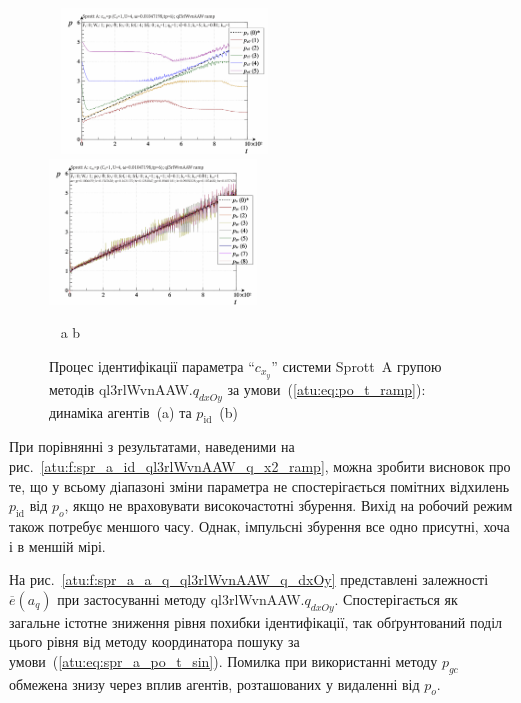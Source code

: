 \begin{figure}[htb!]
\begin{center}
  ~ \hfill
    \includegraphics[width=0.49\textwidth]{p/cha/spr_a/ql3rlWvnAAW_dxOy/sprott_a_id2-p_t_pi_ql3rlWvnAAW_ramp.png}
    \hfill
    \includegraphics[width=0.49\textwidth]{p/cha/spr_a/ql3rlWvnAAW_dxOy/sprott_a_id2-p_t_p_ql3rlWvnAAW_ramp.png}
  \hfill ~
\end{center}
  \vspace{-1.0ex}
  \begin{center}
    ~ \hfill a \hfill\hfill b \hfill ~
  \end{center}
  \caption{Процес ідентифікації параметра ``$c_{x_y}$'' системи Sprott~A групою методів ql3rlWvnAAW.$q_{dxOy}$ за умови~(\ref{atu:eq:po_t_ramp}): динаміка агентів~(a) та $p_\mathrm{id}$~(b)}
  \label{atu:f:spr_a_id_ql3rlWvnAAW_q_dxOy_ramp}
\end{figure}

При порівнянні з результатами, наведеними на
рис.~\ref{atu:f:spr_a_id_ql3rlWvnAAW_q_x2_ramp}, можна зробити висновок про те, що у
всьому діапазоні зміни параметра не спостерігається помітних
відхилень
$p_\mathrm{id}$ від
$p_o$, якщо не враховувати високочастотні збурення. Вихід на
робочий режим також потребує меншого часу. Однак, імпульсні збурення
все одно присутні, хоча і в меншій мірі.

На рис.~\ref{atu:f:spr_a_a_q_ql3rlWvnAAW_q_dxOy} представлені залежності
$\overline{e}(a_q)$ при застосуванні методу
ql3rlWvnAAW.$q_{dxOy}$.
Спостерігається як загальне істотне зниження рівня похибки
ідентифікації, так обґрунтований поділ цього рівня від методу
координатора пошуку за умови~(\ref{atu:eq:spr_a_po_t_sin}). Помилка при
використанні методу
$p_{gc}$ обмежена знизу через вплив агентів, розташованих у
видаленні від
$p_o$.


